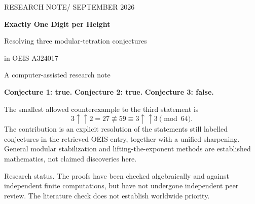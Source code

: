 \documentclass[11pt,a4paper]{article}
\numberwithin{equation}{section}
\theoremstyle{plain}
\theoremstyle{definition}
\begin{document}
\thispagestyle{empty}
\begin{flushleft}
{\small\sffamily\color{accent}RESEARCH NOTE\quad / SEPTEMBER 2026}\par
\vspace{8mm}
{\LARGE\bfseries\color{ink}Exactly One Digit per Height}\par
\vspace{3mm}
{\Large Resolving three modular-tetration conjectures\par in OEIS A324017}\par
\vspace{5mm}
{\normalsize A computer-assisted research note}
\end{flushleft}
\vspace{3mm}
\begin{abstract}
OEIS A324017 records three conjectures about the residues of
$T_m=(2n-1)\uparrow\uparrow m$ modulo $(2n)^m$.  We prove the first two
and disprove the third for every nontrivial base in its stated domain.
The organizing result is stronger: if $q\ge4$ is even, $T_0=1$, and
$T_{h+1}=(q-1)^{T_h}$, then, for every $h\ge0$ and $r\ge1$,
\[
 T_{h+r}-T_h\equiv-2q^h\pmod{q^{h+1}}.
\]
Consequently, the tower acquires exactly one additional stable base-$q$
digit at each height.  We also determine every relevant prime-adic
valuation, prove uniqueness of the modular fixed point, give a
factorization-free digit-lifting algorithm, and extend the modular
stabilization result to arbitrarily high Knuth arrow ranks.  A local
Lambert $W$ representation explains the limiting values and the
essential sign distinction at the prime $2$.
All main proofs are elementary and self-contained.  A standard-library
Python implementation and independent exact-arithmetic checks accompany
the article.
\end{abstract}
\begin{resultbox}[title=Outcome and scope]
\textbf{Conjecture 1: true.}\quad
\textbf{Conjecture 2: true.}\quad
\textbf{Conjecture 3: false.}

The smallest allowed counterexample to the third statement is
\[
 3\uparrow\uparrow2=27\not\equiv59
   \equiv3\uparrow\uparrow3\pmod{64}.
\]
The contribution is an explicit resolution of the statements still
labelled conjectures in the retrieved OEIS entry, together with a
unified sharpening.  General modular stabilization and lifting-the-exponent
methods are established mathematics, not claimed discoveries here.
\end{resultbox}
\vfill
{\small\color{muted}Research status. The proofs have been checked algebraically and
against independent finite computations, but have not undergone independent
peer review. The literature check does not establish worldwide priority.}
\end{document}
